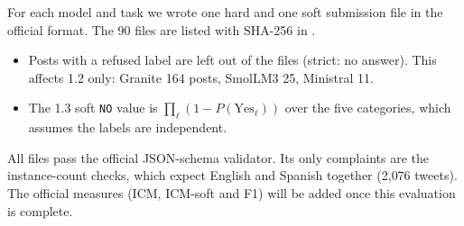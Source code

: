 \documentclass[11pt]{article}
\begin{document}
For each model and task we wrote one hard and one soft submission file in the official format. The 90 files are listed with SHA-256 in .
\begin{itemize}
  \item Posts with a refused label are left out of the files (strict: no answer). This affects 1.2 only: Granite 164 posts, SmolLM3 25, Ministral 11.
  \item The 1.3 soft \texttt{NO} value is $\prod_{\ell}(1 - P(\text{Yes}_\ell))$ over the five categories, which assumes the labels are independent.
\end{itemize}
All files pass the official JSON-schema validator. Its only complaints are the instance-count checks, which expect English and Spanish together (2{,}076 tweets). The official measures (ICM, ICM-soft and F1) will be added once this evaluation is complete.
\end{document}
